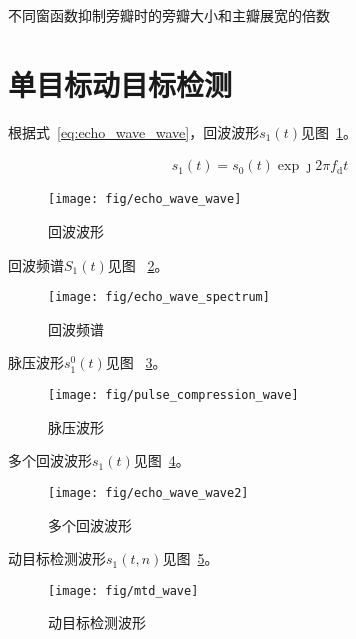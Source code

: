 \documentclass[../main]{subfiles}
\begin{document}
\begin{table}[htbp]
  \centering
  \caption{不同窗函数抑制旁瓣时的旁瓣大小和主瓣展宽的倍数}%
  \label{tab:window}
\end{table}

\section{单目标动目标检测}%
\label{sec:single_mtd}

根据式~\ref{eq:echo_wave_wave}，回波波形$s_1(t)$见图~\ref{fig:echo_wave_wave}。

\begin{align}
  s_1(t) = s_0(t)\exp{\jmath 2\pi f_\mathrm{d}t}
\end{align}

\begin{figure}[htbp]
  \centering
  \texttt{[image: fig/echo\_wave\_wave]}
  \caption{回波波形}%
  \label{fig:echo_wave_wave}
\end{figure}

回波频谱$S_1(t)$见图%
~\ref{fig:echo_wave_spectrum}。

\begin{figure}[htbp]
  \centering
  \texttt{[image: fig/echo\_wave\_spectrum]}
  \caption{回波频谱}%
  \label{fig:echo_wave_spectrum}
\end{figure}

脉压波形$s_1^0(t)$见图%
~\ref{fig:pulse_compression_wave}。

\begin{figure}[htbp]
  \centering
  \texttt{[image: fig/pulse\_compression\_wave]}
  \caption{脉压波形}%
  \label{fig:pulse_compression_wave}
\end{figure}

多个回波波形$s_1(t)$见图~\ref{fig:echo_wave_wave2}。

\begin{figure}[htbp]
  \centering
  \texttt{[image: fig/echo\_wave\_wave2]}
  \caption{多个回波波形}%
  \label{fig:echo_wave_wave2}
\end{figure}

动目标检测波形$s_1(t, n)$见图~\ref{fig:mtd_wave}。

\begin{figure}[htbp]
  \centering
  \texttt{[image: fig/mtd\_wave]}
  \caption{动目标检测波形}%
  \label{fig:mtd_wave}
\end{figure}
\end{document}
